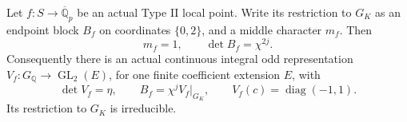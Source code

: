 \begin{proposition}
\label{AC-G68-block}
Let \(f:S\to\overline{\mathbb Q}_p\) be an actual Type II
local point. Write its restriction to \(G_K\) as an endpoint
block \(B_f\) on coordinates \(\{0,2\}\), and a middle
character \(m_f\). Then
\[
                  m_f=1,\qquad \det B_f=\chi^{2j}.
                                                        \tag{RT.1}
\]
Consequently there is an actual continuous integral odd
representation \(V_f:G_{\mathbb Q}\to\operatorname{GL}_2(E)\),
for one finite coefficient extension \(E\), with
\[
 \det V_f=\eta,\qquad
 B_f=\chi^j V_f|_{G_K},\qquad
 V_f(c)=\operatorname{diag}(-1,1).
                                                        \tag{RT.2}
\]
Its restriction to \(G_K\) is irreducible.
\end{proposition}
